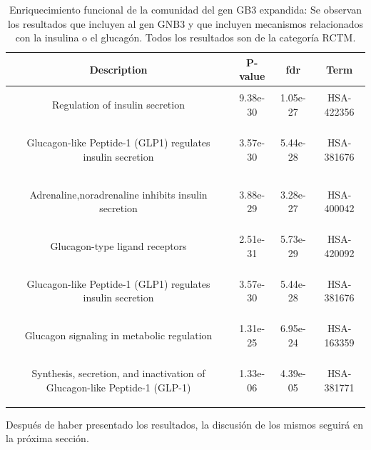 \begin{table}[h]
	\centering
	\caption{Enriquecimiento funcional de la comunidad del gen GB3 expandida: Se observan los resultados que incluyen al gen GNB3 y que incluyen mecanismos relacionados con la insulina o el glucagón. Todos los resultados son de la categoría RCTM.}
	\label{table:enriquecimiento2}
	\begin{tabular}{|c|c|c|c|}
		\hline
		 \textbf{Description} & \textbf{P-value} &\textbf{ fdr }&  \textbf{Term} \\ \hline
		 \begin{flushleft} Regulation of insulin secretion \end{flushleft} & 9.38e-30 & 1.05e-27 &   HSA-422356 \\ \hline
		 \begin{flushleft} Glucagon-like Peptide-1 (GLP1) regulates insulin secretion \end{flushleft} & 3.57e-30 & 5.44e-28  & HSA-381676 \\ \hline
		 \begin{flushleft} Adrenaline,noradrenaline inhibits insulin secretion \end{flushleft} & 3.88e-29 & 3.28e-27  & HSA-400042 \\ \hline
		 \begin{flushleft} Glucagon-type ligand receptors \end{flushleft} & 2.51e-31 & 5.73e-29  & HSA-420092 \\ \hline
		 \begin{flushleft} Glucagon-like Peptide-1 (GLP1) regulates insulin secretion \end{flushleft} & 3.57e-30 & 5.44e-28  & HSA-381676 \\ \hline
		 \begin{flushleft} Glucagon signaling in metabolic regulation \end{flushleft} & 1.31e-25 & 6.95e-24  & HSA-163359 \\ \hline
		 \begin{flushleft} Synthesis, secretion, and inactivation of Glucagon-like Peptide-1 (GLP-1) \end{flushleft} & 1.33e-06 & 4.39e-05  & HSA-381771 \\ \hline
	\end{tabular}

\end{table}

Después de haber presentado los resultados, la discusión de los mismos seguirá en la próxima sección.
